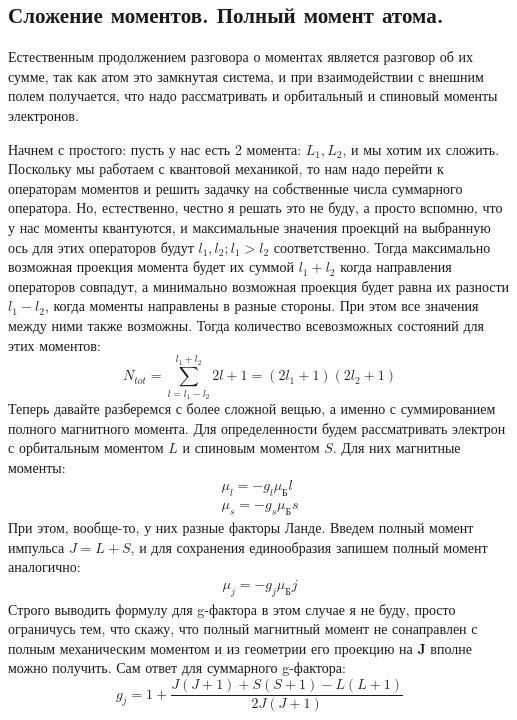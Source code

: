 \documentclass[12pt]{article}
\begin{document}
\subsection{Сложение моментов. Полный момент атома.}
Естественным продолжением разговора о моментах является разговор об их сумме, так как атом это замкнутая система, и при взаимодействии с внешним полем получается, что надо рассматривать и орбитальный и спиновый моменты электронов.

Начнем с простого: пусть у нас есть 2 момента: $L_1, L_2$, и мы хотим их сложить. Поскольку мы работаем с квантовой механикой, то нам надо перейти к операторам моментов и решить задачку на собственные числа суммарного оператора. Но, естественно, честно я решать это не буду, а просто вспомню, что у нас моменты квантуются, и максимальные значения проекций на выбранную ось для этих операторов будут $l_1, l_2; l_1>l_2$ соответственно. Тогда максимально возможная проекция момента будет их суммой $l_1 + l_2$ когда направления операторов совпадут, а минимально возможная проекция будет равна их разности $l_1 - l_2$, когда моменты направлены в разные стороны. При этом все значения между ними также возможны. Тогда количество всевозможных состояний для этих моментов:
\begin{equation*}
    N_{tot} = \sum\limits_{l=l_1-l_2}^{l_1+l_2}2l+1 = (2l_1+1)(2l_2+1)
\end{equation*}
Теперь давайте разберемся с более сложной вещью, а именно с суммированием полного магнитного момента. Для определенности будем рассматривать электрон с орбитальным моментом $L$ и спиновым моментом $S$. Для них магнитные моменты:
\begin{gather*}
    \mu_l = -g_l\mu_{\text{Б}}l\\
    \mu_s = -g_s\mu_{\text{Б}}s
\end{gather*}
При этом, вообще-то, у них разные факторы Ланде. Введем полный момент импульса $J = L+S$, и для сохранения единообразия запишем полный момент аналогично: 
\begin{gather*}
    \mu_j = -g_j\mu_{\text{Б}}j
\end{gather*}
Строго выводить формулу для g-фактора в этом случае я не буду, просто ограничусь тем, что скажу, что полный магнитный момент не сонаправлен с полным механическим моментом и из геометрии его проекцию на $\textbf{J}$ вполне можно получить. Сам ответ для суммарного g-фактора:
\begin{equation*}
    g_j = 1+\dfrac{J(J+1) + S(S+1) - L(L+1)}{2J(J+1)} 
\end{equation*}
\end{document}
